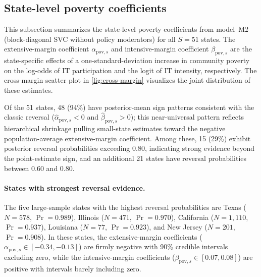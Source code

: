 
\subsection{State-level poverty coefficients}
\label{smd:states}

This subsection summarizes the state-level poverty coefficients from
model~M2 (block-diagonal SVC without policy moderators) for all
$S = 51$ states.  The extensive-margin coefficient
$\alpha_{\mathrm{pov},s}$ and intensive-margin coefficient
$\beta_{\mathrm{pov},s}$ are the state-specific effects of a
one-standard-deviation increase in community poverty on the log-odds of
IT participation and the logit of IT intensity, respectively.  The
cross-margin scatter plot in \cref{fig:cross-margin} visualizes the
joint distribution of these estimates.

Of the 51 states, 48 (94\%) have posterior-mean sign patterns consistent
with the classic reversal
($\hat{\alpha}_{\mathrm{pov},s} < 0$ and
$\hat{\beta}_{\mathrm{pov},s} > 0$); this near-universal pattern
reflects hierarchical shrinkage pulling small-state estimates toward
the negative population-average extensive-margin coefficient.
Among these, 15 (29\%) exhibit posterior reversal probabilities
exceeding 0.80, indicating strong evidence beyond the point-estimate
sign, and an additional 21 states have reversal probabilities between
0.60 and 0.80.

\paragraph{States with strongest reversal evidence.}
The five large-sample states with the highest reversal probabilities are
Texas ($N = 578$, $\Pr = 0.989$),
Illinois ($N = 471$, $\Pr = 0.970$),
California ($N = 1{,}110$, $\Pr = 0.937$),
Louisiana ($N = 77$, $\Pr = 0.923$), and
New Jersey ($N = 201$, $\Pr = 0.908$).
In these states, the extensive-margin coefficients
($\alpha_{\mathrm{pov},s} \in [-0.34, -0.13]$) are firmly negative
with 90\% credible intervals excluding zero, while the
intensive-margin coefficients
($\beta_{\mathrm{pov},s} \in [0.07, 0.08]$) are positive with
intervals barely including zero.

